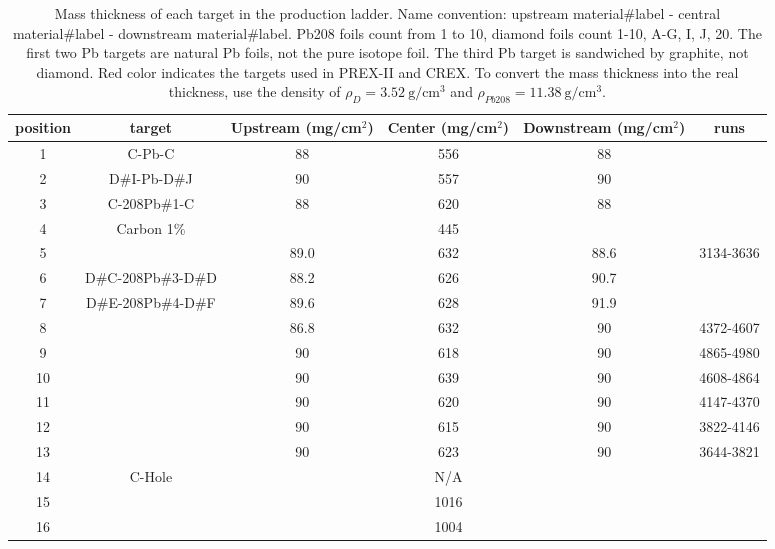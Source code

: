 \begin{table}[!h]
    \centering
    \begin{tabular}{c | c | c c c c}
	\hline
	position    & target& \makecell{Upstream \\ (mg/cm${}^2$)}    & \makecell{Center \\ (mg/cm${}^2$)}     & \makecell{Downstream \\ (mg/cm${}^2$)}   & runs  \\
	\hline
	1   & C-Pb-C	    & 88    & 556   & 88    & \\
	2   & D\#I-Pb-D\#J      & 90    & 557   & 90    & \\
	\hline
	3   & C-208Pb\#1-C    & 88    & 620   & 88    & \\
	4   & Carbon 1\%    &       & 445   &	    & \\
	\hline
	5   & \color{red}{D\#A-208Pb\#2-D\#B}  & 89.0  & 632   & 88.6  & 3134-3636 \\
	6   & D\#C-208Pb\#3-D\#D  & 88.2  & 626   & 90.7  & \\
	7   & D\#E-208Pb\#4-D\#F  & 89.6  & 628   & 91.9  & \\
	8   & \color{red}{D\#G-208Pb\#5-D\#20} & 86.8  & 632   & 90    & 4372-4607 \\
	9   & \color{red}{D\#1-208Pb\#6-D\#2}  & 90    & 618   & 90    & 4865-4980 \\
	10  & \color{red}{D\#3-208Pb\#7-D\#4}  & 90    & 639   & 90    & 4608-4864 \\
	11  & \color{red}{D\#5-208Pb\#8-D\#6}  & 90    & 620   & 90    & 4147-4370 \\
	12  & \color{red}{D\#7-208Pb\#9-D\#8}  & 90    & 615   & 90    & 3822-4146 \\
	13  & \color{red}{D\#9-208Pb\#10-D\#10}& 90    & 623   & 90    & 3644-3821 \\
	\hline
	14  & C-Hole	    &       & N/A   &       & \\
	15  & \color{red}{\Ca}	    &       & 1016  &       & \\
	16  & \ca	    &       & 1004  &       & \\
	\hline
    \end{tabular}
    \caption[Target mass thickness]
    {Mass thickness of each target in the production ladder. 
    Name convention: upstream material\#label - central material\#label - downstream material\#label. 
    Pb208 foils count from 1 to 10, diamond foils count 1-10, A-G, I, J, 20. 
    The first two Pb targets are natural Pb foils, not the pure \Pb isotope foil. 
    The third Pb target is sandwiched by graphite, not diamond. Red color indicates
    the targets used in PREX-II and CREX. To convert the mass thickness into 
    the real thickness, use the density of $\rho_D = 3.52\ \mathrm{g}/\mathrm{cm}^3$ 
    and $\rho_{Pb208} = 11.38 \ \mathrm{g}/\mathrm{cm}^3$.}
    \label{tab:target_thickness}
\end{table}

